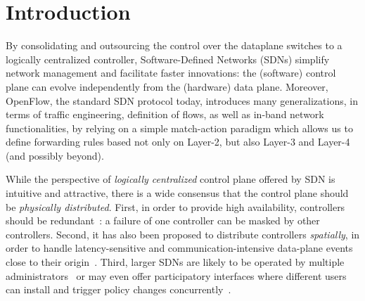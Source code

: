 \documentclass[conference]{sigcomm-alternate}
\begin{document}


%
%
%
%
%
%

\section{Introduction}\label{sec:intro}
By consolidating and outsourcing the control over the dataplane switches to a logically
centralized controller, Software-Defined Networks (SDNs)
simplify network management and facilitate faster innovations:
the (software) control plane can evolve independently from the
(hardware) data plane.
Moreover, OpenFlow, the standard SDN protocol today, introduces many generalizations,
in terms of traffic engineering, definition of flows, as well as in-band network functionalities,
by relying on a simple match-action paradigm which allows us to define
forwarding rules based not only on Layer-2, but also Layer-3 and Layer-4 (and possibly beyond).

While the perspective of \emph{logically centralized} control plane
offered by SDN is intuitive and attractive,
there is a wide consensus that
the control plane should be  \emph{physically distributed}.
First, in order to provide high availability, 
controllers should be redundant~\cite{onix,stn,onos}: a failure
of one controller can be masked by other controllers. 
Second, it has also been proposed to distribute controllers \emph{spatially}, in order to handle latency-sensitive and
communication-intensive 
data-plane
events close to their origin~\cite{devoflow,kandoo,jukka,disco}.
Third, larger SDNs are likely to be operated by multiple administrators~\cite{stn} or may even offer
participatory interfaces where different users can install and trigger policy changes
concurrently~\cite{participatory}.
\end{document}

